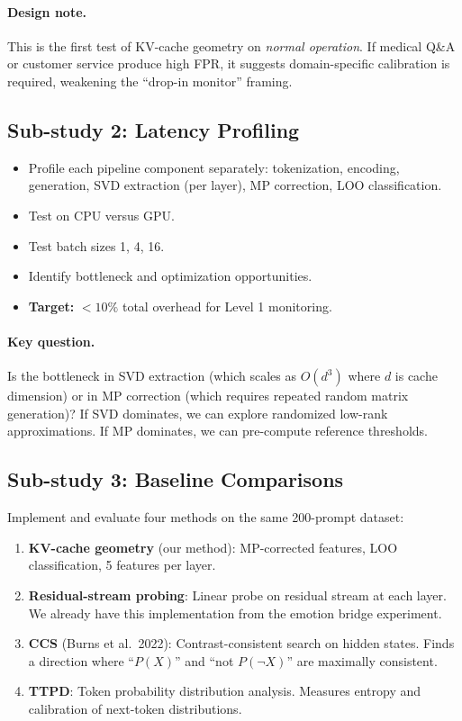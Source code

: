\documentclass[11pt,letterpaper]{article}
\begin{document}
\paragraph{Design note.} This is the first test of KV-cache geometry on
\emph{normal operation}. If medical Q\&A or customer service produce
high FPR, it suggests domain-specific calibration is required, weakening
the ``drop-in monitor'' framing.

\subsection{Sub-study 2: Latency Profiling}

\begin{itemize}
  \item Profile each pipeline component separately: tokenization,
    encoding, generation, SVD extraction (per layer), MP correction, LOO
    classification.
  \item Test on CPU versus GPU.
  \item Test batch sizes 1, 4, 16.
  \item Identify bottleneck and optimization opportunities.
  \item \textbf{Target:} $< 10\%$ total overhead for Level 1 monitoring.
\end{itemize}

\paragraph{Key question.} Is the bottleneck in SVD extraction (which
scales as $O(d^3)$ where $d$ is cache dimension) or in MP correction
(which requires repeated random matrix generation)? If SVD dominates, we
can explore randomized low-rank approximations. If MP dominates, we can
pre-compute reference thresholds.

\subsection{Sub-study 3: Baseline Comparisons}

Implement and evaluate four methods on the same 200-prompt dataset:

\begin{enumerate}[leftmargin=*]
  \item \textbf{KV-cache geometry} (our method): MP-corrected features,
    LOO classification, 5 features per layer.
  \item \textbf{Residual-stream probing}: Linear probe on residual
    stream at each layer. We already have this implementation from the
    emotion bridge experiment.
  \item \textbf{CCS} (Burns et al.\ 2022): Contrast-consistent search on
    hidden states. Finds a direction where ``$P(X)$'' and ``not
    $P(\neg X)$'' are maximally consistent.
  \item \textbf{TTPD}: Token probability distribution analysis. Measures
    entropy and calibration of next-token distributions.
\end{enumerate}
\end{document}
